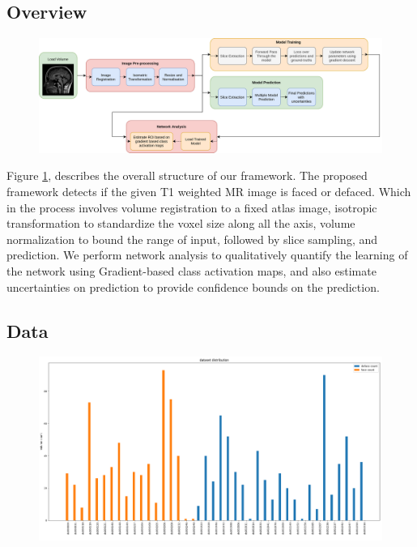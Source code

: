 \documentclass[runningheads]{llncs}
\begin{document}
\subsection{Overview}
\begin{figure}
 \centering
 \label{fig:overview}
 \includegraphics[width=1\textwidth]{images/overview.png}
 \caption{}
\end{figure}

Figure \ref{fig:overview}, describes the overall structure of our framework. The proposed framework detects if the given T1 weighted MR image is faced or defaced. Which in the process involves volume registration to a fixed atlas image, isotropic transformation to standardize the voxel size along all the axis, volume normalization to bound the range of input, followed by slice sampling, and prediction. We perform network analysis to qualitatively quantify the learning of the network using Gradient-based class activation maps, and also estimate uncertainties on prediction to provide confidence bounds on the prediction. 


\subsection{Data}
\begin{figure}
 \centering
 \label{fig:volumecount}
 \includegraphics[width=1\textwidth]{images/volumecount.png}
 \caption{}
\end{figure}
\end{document}
